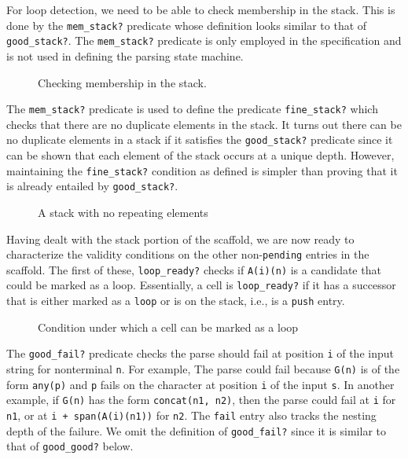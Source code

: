 \documentclass[sigplan,10pt,anonymous,review]{acmart}\settopmatter{printfolios=true,printccs=false,printacmref=false}
\begin{document}
\begin{CCSXML}
For loop detection, we need to be able to check membership in the stack.
This is done by the \texttt{mem\_stack?} predicate whose definition looks
similar to that of \texttt{good\_stack?}\@.  The \texttt{mem\_stack?} predicate is only employed in the specification and is not used in defining the parsing
state machine.  
                      
\begin{figure}[h!]
  
    \vspace*{-4mm}
			\caption{Checking membership in the stack. }
			\label{pvs:memcheck}
\end{figure}

The \texttt{mem\_stack?} predicate is used to define the predicate \texttt{fine\_stack?} which checks that there are no duplicate elements in the stack.   It turns out there can be no duplicate elements in a stack if it satisfies the \texttt{good\_stack?} predicate since it can be shown that each element of the stack occurs at a unique depth.  However, maintaining the \texttt{fine\_stack?} condition as defined is simpler than proving that 
it is already entailed by \texttt{good\_stack?}.

\begin{figure}[h!]
  
    \vspace*{-4mm}
			\caption{A stack with no repeating elements }
			\label{pvs:finestack}
\end{figure}

Having dealt with the stack portion of the scaffold, we are now ready to characterize the validity conditions on the other non-\texttt{pending} entries in the scaffold.
The first of these, \texttt{loop\_ready?} checks if \texttt{A(i)(n)} is a candidate that could be marked as a loop.
Essentially, a cell is \texttt{loop\_ready?} if it has a successor that
is either marked as a \texttt{loop} or is on the stack, i.e., is a \texttt{push} entry.   
\begin{figure}[h!]
  
    \vspace*{-4mm}
			\caption{Condition under which a cell can be marked as a loop}
			\label{pvs:loopready}
                      \end{figure}

The \texttt{good\_fail?} predicate checks the parse should fail at position \texttt{i} of the input string for nonterminal \texttt{n}\@.  For example, The parse could fail because \texttt{G(n)} is of the form \texttt{any(p)} and \texttt{p} fails on the character at position \texttt{i} of the input \texttt{s}\@.  In another example, if \texttt{G(n)} has the form \texttt{concat(n1, n2)}, then the parse could fail at \texttt{i} for \texttt{n1}, or at \texttt{i + span(A(i)(n1))} for \texttt{n2}\@.  The \texttt{fail} entry also tracks the nesting depth of the failure.  We omit the definition of
                      \texttt{good\_fail?} since it is similar to that of
                      \texttt{good\_good?} below. 
                      

\end{CCSXML}
\end{document}
